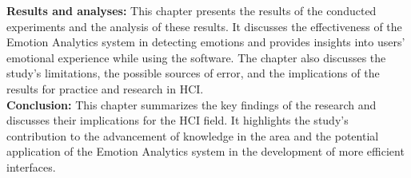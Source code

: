 \begin{resumo-ingles}
  \textbf{Results and analyses:} This chapter presents the results of the conducted experiments and the analysis of these results. It discusses the effectiveness of the Emotion Analytics system in detecting emotions and provides insights into users' emotional experience while using the software. The chapter also discusses the study's limitations, the possible sources of error, and the implications of the results for practice and research in HCI.
  \\

  \textbf{Conclusion:} This chapter summarizes the key findings of the research and discusses their implications for the HCI field. It highlights the study's contribution to the advancement of knowledge in the area and the potential application of the Emotion Analytics system in the development of more efficient interfaces.
\end{resumo-ingles}
